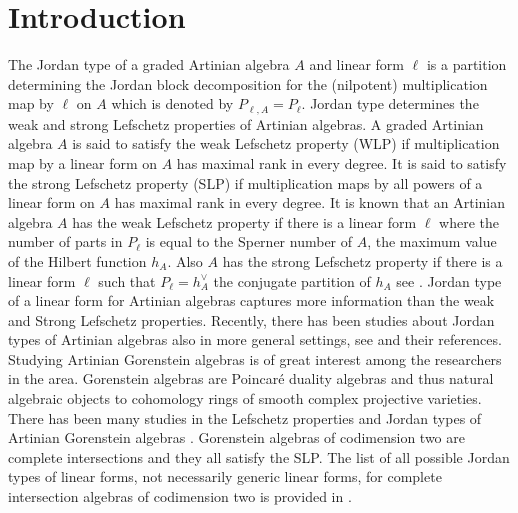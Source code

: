 \documentclass[12pt]{amsart}
\numberwithin{equation}{section}
\theoremstyle{plain} \newtheorem{theorem}{Theorem}[section]
\theoremstyle{definition} \newtheorem{definition}[theorem]{Definition}
\begin{document}
\section{Introduction}
The Jordan type of a graded Artinian algebra $A$ and linear form $\ell$ is a partition determining the Jordan block decomposition for the (nilpotent) multiplication map by $\ell$ on $A$ which is denoted by $P_{\ell,A}=P_\ell$. Jordan type determines the weak and strong Lefschetz properties of Artinian  algebras. A graded Artinian algebra $A$ is said to satisfy the weak Lefschetz property (WLP) if multiplication map by a linear form on $A$ has maximal rank in every degree. It is said to satisfy the strong Lefschetz property (SLP) if multiplication maps by all powers of a linear form on $A$ has maximal rank in every degree. It is known that an Artinian  algebra $A$ has the weak Lefschetz property if there is a linear form $\ell$ where the number of parts in $P_\ell$ is equal to the Sperner number of $A$, the maximum value of the Hilbert function $h_A$. Also $A$ has the strong Lefschetz property if there is a linear form $\ell$ such that $P_\ell = h^\vee_A$ the conjugate partition of $h_A$ see \cite{IMM}.
Jordan type of a linear form for Artinian  algebras captures more information than the weak and Strong Lefschetz properties. Recently, there has been studies about Jordan types of Artinian  algebras also in more general settings, see \cite{IMM, IMM2, IKVZ} and their references.  
Studying Artinian    Gorenstein algebras is of great interest among the researchers in the area.   Gorenstein algebras are Poincar\'e duality algebras \cite{MW} and thus natural algebraic objects to cohomology rings of smooth complex projective varieties. 
There has been many studies in the Lefschetz properties and Jordan types of Artinian    Gorenstein algebras \cite{CG, HW, GZ, Gondim, MH}.
  Gorenstein algebras of codimension two are  complete intersections and they all satisfy the SLP.  The list of all possible Jordan types of linear forms, not necessarily generic linear forms, for complete intersection algebras of codimension two is provided in \cite{CIJT}. 
   
\end{document}
